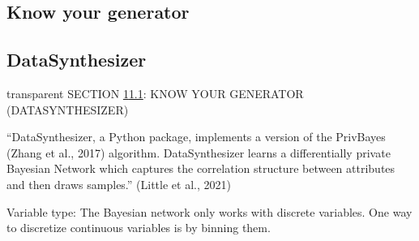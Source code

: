 \documentclass[t,8pt,utfx8]{beamer}
\begin{document}
\begin{spacing}{1.25}
\section{Know your generator}\label{sec:sdg}
\subsection{DataSynthesizer}\label{sec:sdg_datasynthesizer}
\begin{frame}[c,plain]
\vskip-4mm
\begin{beamercolorbox}[wd=\boxwidth,ht=22.11mm]{transparent}%
    \vfill%
    \leftinsert%
    \MakeUppercase{Section \ref{sec:sdg}\ref{sec:sdg_datasynthesizer}: Know your generator (DataSynthesizer)} %
\end{beamercolorbox}
\vskip-3mm

``DataSynthesizer, a Python package, implements a version of the PrivBayes (Zhang et al., 2017) algorithm. DataSynthesizer learns a differentially private Bayesian Network which captures the correlation structure between attributes and then draws samples.'' (Little et al., 2021)

Variable type: The Bayesian network only works with discrete variables. One way to discretize continuous variables is by binning them.

\end{frame}




\end{spacing}
\end{document}
